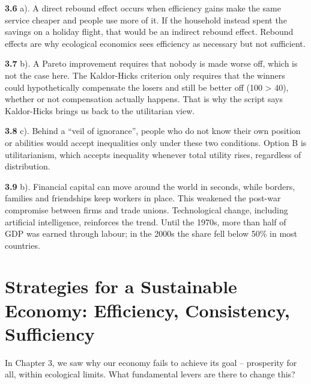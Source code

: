 \documentclass[
  british,
  a4paper,
  DIV=11,
  numbers=noendperiod,
  oneside,
  openany]{scrreprt}
\begin{document}
\textbf{3.6} a). A direct rebound effect occurs when efficiency gains
make the same service cheaper and people use more of it. If the
household instead spent the savings on a holiday flight, that would be
an indirect rebound effect. Rebound effects are why ecological economics
sees efficiency as necessary but not sufficient.

\textbf{3.7} b). A Pareto improvement requires that nobody is made worse
off, which is not the case here. The Kaldor-Hicks criterion only
requires that the winners could hypothetically compensate the losers and
still be better off (100 \textgreater{} 40), whether or not compensation
actually happens. That is why the script says Kaldor-Hicks brings us
back to the utilitarian view.

\textbf{3.8} c). Behind a ``veil of ignorance'', people who do not know
their own position or abilities would accept inequalities only under
these two conditions. Option B is utilitarianism, which accepts
inequality whenever total utility rises, regardless of distribution.

\textbf{3.9} b). Financial capital can move around the world in seconds,
while borders, families and friendships keep workers in place. This
weakened the post-war compromise between firms and trade unions.
Technological change, including artificial intelligence, reinforces the
trend. Until the 1970s, more than half of GDP was earned through labour;
in the 2000s the share fell below 50\% in most countries.

\chapter{Strategies for a Sustainable Economy: Efficiency, Consistency,
Sufficiency}\label{strategies-for-a-sustainable-economy-efficiency-consistency-sufficiency}

\begin{tcolorbox}[enhanced jigsaw, arc=.35mm, bottomrule=.15mm, bottomtitle=1mm, breakable, colback=white, colbacktitle=quarto-callout-note-color!10!white, colframe=quarto-callout-note-color-frame, coltitle=black, left=2mm, leftrule=.75mm, opacityback=0, opacitybacktitle=0.6, rightrule=.15mm, title={Guiding question}, titlerule=0mm, toprule=.15mm, toptitle=1mm]

In Chapter 3, we saw why our economy fails to achieve its goal --
prosperity for all, within ecological limits. What fundamental levers
are there to change this?

\end{tcolorbox}
\end{document}
